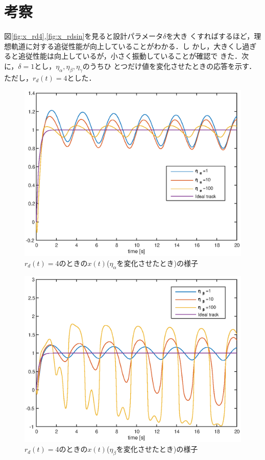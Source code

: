 \documentclass[a4paper,12pt]{jarticle}
\begin{document}
\section{考察}
図\ref{fig:x_rd4},\ref{fig:x_rdsin}を見ると設計パラメータ$\delta$を大き
くすればするほど，理想軌道に対する追従性能が向上していることがわかる．し
かし，大きくし過ぎると追従性能は向上しているが，小さく振動していることが確認で
きた．次に，$\delta=1$とし，$\eta_\alpha,\eta_\beta,\eta_\gamma$のうちひ
とつだけ値を変化させたときの応答を示す．ただし，$r_d(t)=4$とした．
%
\begin{figure}[b]
    \begin{center}
       \includegraphics[width=140mm]{fig/x_rd4_Etaa.eps}
        \caption{$r_d(t)=4$のときの$x(t)$($\eta_\alpha$を変化させたとき)の様子}
        \label{fig:x_rd4etaa}
    \end{center}
\end{figure}
%
%
\begin{figure}[htb]
    \begin{center}
       \includegraphics[width=140mm]{fig/x_rd4_Etab.eps}
        \caption{$r_d(t)=4$のときの$x(t)$($\eta_\beta$を変化させたとき)の様子}
        \label{fig:x_rd4etab}
    \end{center}
\end{figure}
\end{document}
